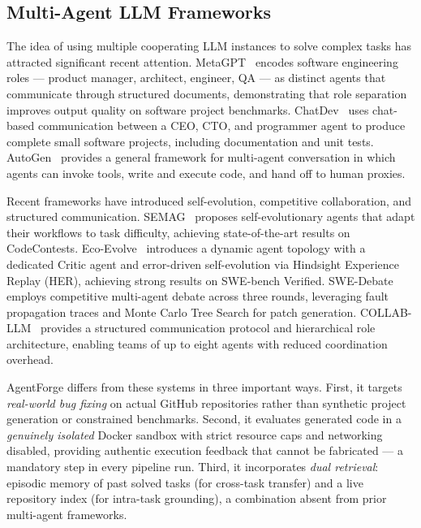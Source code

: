 \subsection{Multi-Agent LLM Frameworks}

The idea of using multiple cooperating LLM instances
to solve complex tasks has attracted significant
recent attention.
MetaGPT~\cite{hong2023metagpt} encodes software
engineering roles — product manager, architect,
engineer, QA — as distinct agents that communicate
through structured documents, demonstrating that
role separation improves output quality on
software project benchmarks.
ChatDev~\cite{qian2023communicative} uses
chat-based communication between a CEO, CTO, and
programmer agent to produce complete small software
projects, including documentation and unit tests.
AutoGen~\cite{wu2023autogen} provides a general
framework for multi-agent conversation in which
agents can invoke tools, write and execute code,
and hand off to human proxies.

Recent frameworks have introduced self-evolution,
competitive collaboration, and structured
communication. SEMAG~\cite{semag2026} proposes
self-evolutionary agents that adapt their workflows
to task difficulty, achieving state-of-the-art
results on CodeContests. Eco-Evolve~\cite{ecoevolve2026}
introduces a dynamic agent topology with a dedicated
Critic agent and error-driven self-evolution via
Hindsight Experience Replay (HER), achieving strong
results on SWE-bench Verified. SWE-Debate~\cite{swedebate2026}
employs competitive multi-agent debate across three
rounds, leveraging fault propagation traces and
Monte Carlo Tree Search for patch generation.
COLLAB-LLM~\cite{collabllm2026} provides a
structured communication protocol and hierarchical
role architecture, enabling teams of up to eight
agents with reduced coordination overhead.

AgentForge differs from these systems in three
important ways.
First, it targets \textit{real-world bug fixing}
on actual GitHub repositories rather than synthetic
project generation or constrained benchmarks.
Second, it evaluates generated code in a
\textit{genuinely isolated} Docker sandbox with
strict resource caps and networking disabled,
providing authentic execution feedback that
cannot be fabricated — a mandatory step in
every pipeline run.
Third, it incorporates \textit{dual retrieval}:
episodic memory of past solved tasks (for
cross-task transfer) and a live repository index
(for intra-task grounding), a combination absent
from prior multi-agent frameworks.

